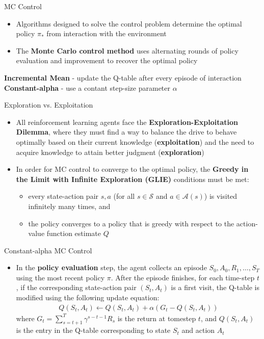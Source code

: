 \documentclass[10pt,mathserif]{beamer}
\begin{document}
\begin{frame}{MC Control}
\begin{itemize}
\item Algorithms designed to solve the control problem determine the optimal policy $\pi_*$ from interaction with 
the environment
\item The \textbf{Monte Carlo control method} uses alternating rounds of policy evaluation and improvement to recover the optimal policy
\end{itemize}
\textbf{Incremental Mean} - update the Q-table after every episode of interaction \\
\textbf{Constant-alpha} - use a contant step-size parameter $\alpha$
\end{frame}

\begin{frame}{Exploration vs. Exploitation}
\begin{itemize}
\item All reinforcement learning agents face the \textbf{Exploration-Exploitation Dilemma}, where they must find a way to balance the drive to behave optimally based on their current knowledge (\textbf{exploitation}) and the need to
acquire knowledge to attain better judgment (\textbf{exploration})
\item In order for MC control to converge to the optimal policy, the \textbf{Greedy in the Limit with Infinite Exploration (GLIE)} conditions must be met:
\begin{itemize}
\item every state-action pair $s,a$ (for all $s\in \mathcal{S}$ and $a\in \mathcal{A}(s)$) is visited infinitely many times, and
\item the policy converges to a policy that is greedy with respect to the action-value function estimate $Q$ 
\end{itemize}
\end{itemize}
\end{frame}

\begin{frame}{Constant-alpha MC Control}
\begin{itemize}
\item In the \textbf{policy evaluation} step, the agent collects an episode $S_0, A_0, R_1, \dots, S_T$ using the most recent policy $\pi$. After the episode finishes, for each time-step $t$, if the corresponding state-action pair 
$(S_t, A_t)$ is a first visit, the Q-table is modified using the following update equation:
\begin{align}
Q(S_t,A_t) \leftarrow Q(S_t,A_t) + \alpha(G_t - Q(S_t,A_t))
\end{align}
where $G_t = \sum_{s=t+1}^T \gamma^{s-t-1}R_s$ is the return at tomestep $t$, and $Q(S_t,A_t)$ is the entry in the 
Q-table corresponding to state $S_t$ and action $A_t$
\end{itemize}
\end{frame}
\end{document}
